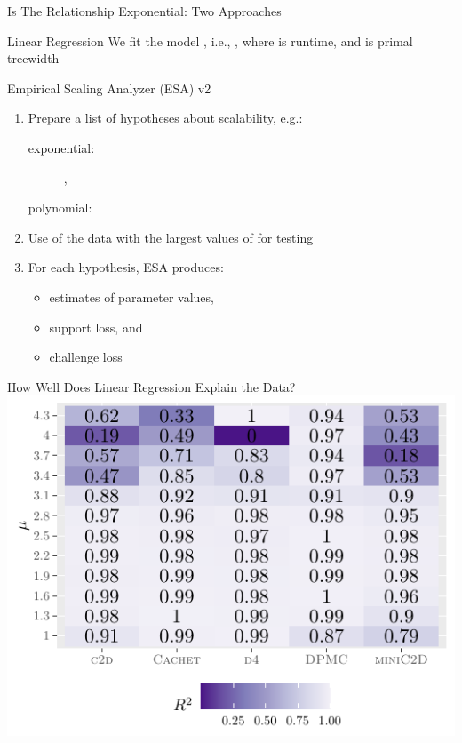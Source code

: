 \documentclass{beamer}
\begin{document}
\begin{frame}{Is The Relationship Exponential: Two Approaches}
  \begin{block}{Linear Regression}
    We fit the model , i.e.,
    , where  is
    \alert{runtime}, and  is \alert{primal treewidth}
    \end{block}
  \begin{block}{Empirical Scaling Analyzer (ESA) v2~\parencite{DBLP:conf/gecco/PushakH20}}
    \begin{enumerate}
      \item Prepare a list of hypotheses about scalability, e.g.:
      \begin{description}
        \item[exponential:] ,
        \item[polynomial:] 
      \end{description}
      \item Use  of the data with the largest
            values of  for testing
      \item For each hypothesis, ESA produces:
      \begin{itemize}
        \item estimates of parameter values,
        \item support loss, and
        \item challenge loss
      \end{itemize}
    \end{enumerate}
  \end{block}
\end{frame}

\begin{frame}{How Well Does Linear Regression Explain the Data?}
  \centering
  \includegraphics{r2.pdf}
\end{frame}
\end{document}
